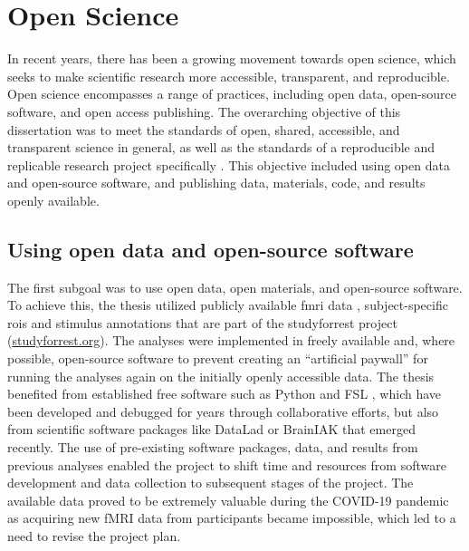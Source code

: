 

\section{Open Science}

In recent years, there has been a growing movement towards open science, which
seeks to make scientific research more accessible, transparent, and
reproducible.
%
Open science encompasses a range of practices, including open data, open-source
software, and open access publishing.
%
The overarching objective of this dissertation was to meet the standards of
open, shared, accessible, and transparent science in general, as well as the
standards of a reproducible and replicable research project specifically
\citep[cf.][]{watson2015will, fecher2014open}.
%
This objective included using open data and open-source software, and publishing
data, materials, code, and results openly available.


\subsection{Using open data and open-source software}

%
The first subgoal was to use open data, open materials, and open-source
software.
%
To achieve this, the thesis utilized publicly available
%
\ac{fmri} data \citep{hanke2014audiomovie, hanke2016simultaneous,
sengupta2016extension},
%
subject-specific \acp{roi} \citep{sengupta2016extension} and
%
stimulus annotations \citep{haeusler2016cutanno}
%
that are part of the studyforrest project
(\href{www.studyforrest.org}{\url{studyforrest.org}}).
%
The analyses were implemented in freely available and, where possible,
open-source software to prevent creating an ``artificial paywall'' for running
the analyses again on the initially openly accessible data.
%
The thesis benefited from established free software such as
%
Python and
%
FSL \citep[\href{https://www.fmrib.ox.ac.uk/fsl}{FMRIB's Software
Library;}][]{smith2004fsl}, which have been developed and debugged for years
through collaborative efforts,
%
but also from scientific software packages like
%
DataLad
\citep[\href{www.datalad.org}{\url{datalad.org}};][]{halchenko2021datalad} or
%
BrainIAK
\citep[\href{https://brainiak.org}{\url{brainiak.org}};][]{kumar2020brainiak,
kumar2020brainiaktutorial}
%
that emerged recently.
%
The use of pre-existing software packages, data, and results from previous
analyses enabled the project to shift time and resources from software
development and data collection to subsequent stages of the project.
%
The available data proved to be extremely valuable during the COVID-19 pandemic
as acquiring new fMRI data from participants became impossible, which led to a
need to revise the project plan.

